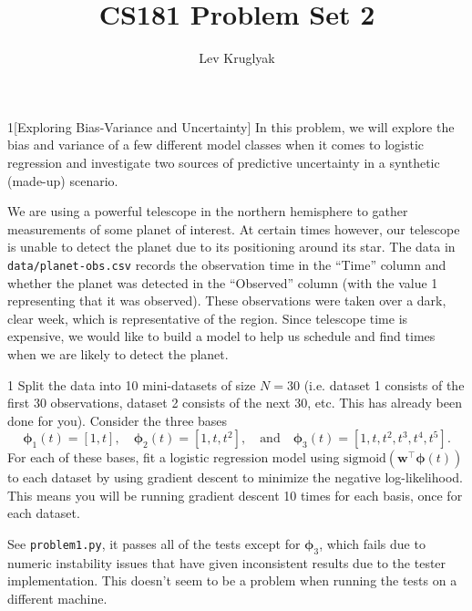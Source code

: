 \documentclass[expanded]{lkx_pset}
\title{CS181 Problem Set 2}
\author{Lev Kruglyak}
\begin{document}
\maketitle

\begin{problem}{1}[Exploring Bias-Variance and Uncertainty]
In this problem, we will explore the bias and variance of a few
different model classes when it comes to logistic regression and
investigate two sources of predictive uncertainty in a synthetic
(made-up) scenario.
\end{problem}

\begin{parts}
	\begin{part}{}
		We are using a powerful telescope in the northern hemisphere to gather
		measurements of some planet of interest. At certain times however, our
		telescope is unable to detect the planet due to its positioning around
		its star.  The data in {\verb|data/planet-obs.csv|} records the
		observation time in the ``Time'' column and whether the planet was
		detected in the ``Observed'' column (with the value 1 representing that
		it was observed).  These observations were taken over a dark, clear
		week, which is representative of the region.  Since telescope time is
		expensive, we would like to build a model to help us schedule and find
		times when we are likely to detect the planet.
	\end{part}

	\begin{part}{1}
		Split the data into 10 mini-datasets of size $N = 30$ (i.e. dataset 1 consists of the first 30 observations, dataset 2 consists of the next 30, etc. This has already been done for you).
		Consider the three bases
		\[\bm{\phi}_1(t) = [1, t],\quad \bm{\phi}_2(t) = [1, t, t^2], \quad\textrm{and}\quad \bm{\phi}_3(t) = [1, t, t^2, t^3, t^4, t^5].\]
		For each of these bases, fit a logistic regression model using $\textrm{sigmoid}(\bm{w}^\intercal \bm{\phi}(t))$ to each dataset by using gradient descent to minimize the negative log-likelihood.  This means you will be
		running gradient descent 10 times for each basis, once for each
		dataset.
	\end{part}

	See \verb|problem1.py|, it passes all of the tests except for $\bm{\phi}_3$, which fails due to numeric instability issues that have given inconsistent results due to the tester implementation. This doesn't seem to be a problem when running the tests on a different machine.


\end{parts}
\end{document}
